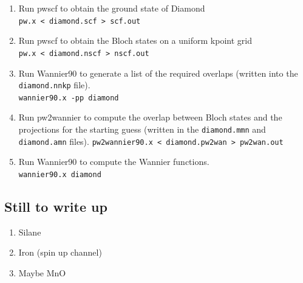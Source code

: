 \documentclass[a4paper,11pt,twoside]{article}
\begin{document}
\begin{enumerate}
\item Run pwscf to obtain the ground state of Diamond\\
{\tt pw.x < diamond.scf > scf.out}

\item Run pwscf to obtain the Bloch states on a uniform kpoint grid\\
{\tt pw.x < diamond.nscf > nscf.out}

\item Run Wannier90 to generate a list of the required overlaps (written
  into the {\tt diamond.nnkp} file).\\ 
{\tt wannier90.x -pp diamond}

\item Run pw2wannier to compute the overlap between Bloch states and the
  projections for the starting guess (written in the {\tt diamond.mmn} and {\tt diamond.amn} files). 
{\tt pw2wannier90.x < diamond.pw2wan > pw2wan.out}

\item Run Wannier90 to compute the Wannier functions.\\
{\tt wannier90.x diamond}

\end{enumerate}

\subsection{Still to write up}

\begin{enumerate}

\item Silane

\item Iron (spin up channel)

\item Maybe MnO

\end{enumerate}
\end{document}
